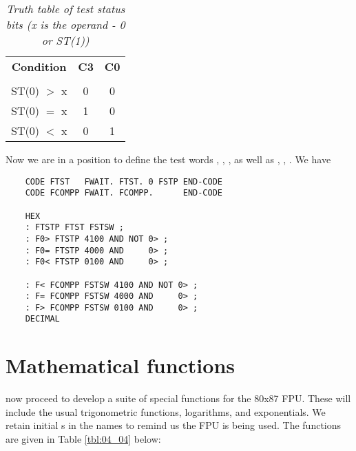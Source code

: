 \begin{table}
    \caption{\textit{Truth table of test status bits (x is the operand - 0 or ST(1))}}
    \label{tbl:04_03}
    \begin{center}
        \begin{tabular}{|c c c|}
            \hline
            \textbf{Condition} &   \textbf{C3} & \textbf{C0} \\
                             &               &             \\
            ST(0) $>$ x      &   0           & 0           \\
            ST(0) $=$ x      &   1           & 0           \\
            ST(0) $<$ x      &   0           & 1           \\
            \hline
        \end{tabular}
    \end{center}
\end{table}

Now we are in a position to define the test words , ,
, as well as , , . We have

\begin{lstlisting}
    CODE FTST   FWAIT. FTST. 0 FSTP END-CODE
    CODE FCOMPP FWAIT. FCOMPP.      END-CODE

    HEX
    : FTSTP FTST FSTSW ;
    : F0> FTSTP 4100 AND NOT 0> ;
    : F0= FTSTP 4000 AND     0> ;
    : F0< FTSTP 0100 AND     0> ;
    
    : F< FCOMPP FSTSW 4100 AND NOT 0> ;
    : F= FCOMPP FSTSW 4000 AND     0> ;
    : F> FCOMPP FSTSW 0100 AND     0> ;
    DECIMAL
\end{lstlisting}

\section{Mathematical functions}

 now proceed to develop a suite of special functions for the 80x87 FPU. These will include the usual trigonometric functions, logarithms, and exponentials. We retain initial s in the names to remind us the FPU is being used. The functions are given in Table \ref{tbl:04_04} below:

